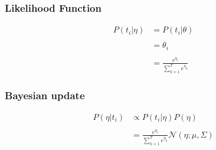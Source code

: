 \begin{frame}
  \frametitle{Likelihood Function}
  \begin{center}
    \vspace{-2em}
    \begin{align*}
    P(t_i | \eta) &= P(t_i | \theta) \\ 
    &\\
    &= \theta_i \\ 
    &\\
    & = \frac{e^{\eta_i}}{\sum_{k=1}^{T}e^{\eta_k}}
  \end{align*}

  \end{center}
\end{frame}

\begin{frame}
  \frametitle{Bayesian update}
  \begin{center}
    \begin{align*}
      P(\eta | t_i) &\propto P(t_i | \eta) P(\eta)\\
      &\\
      &=\frac{e^{\eta_i}}{\sum_{k=1}^{T}e^{\eta_k}} \mathcal{N}(\eta ; \mu, \Sigma)
    \end{align*}
  \end{center}
\end{frame}